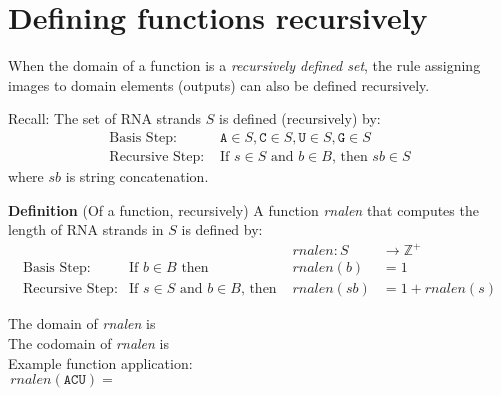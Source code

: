 \documentclass[12pt, oneside]{article}
\newcommand{\A}[0]{\texttt{A}}
\newcommand{\C}[0]{\texttt{C}}
\newcommand{\G}[0]{\texttt{G}}
\newcommand{\U}[0]{\texttt{U}}
\newcommand{\cmark}{\ding{51}}
\newcommand{\xmark}{\ding{55}}
\begin{document}
\vfill
\vfill

\begin{comment}
    

{\it Extra example:} A new movie is released, and $P_1$ and $P_2$ watch it before $P_3$, and give it
ratings; $P_1$ gives \cmark~and $P_2$ gives \xmark.
Should this movie be recommended to $P_3$? Why or why not?

{\it Extra example:} Define a new function that could be used to compare the $4$-tuples of ratings encoding
movie preferences now that there are four movies in the database.

\vfill
\end{comment}
\newpage \vfill
\section*{Defining functions recursively}


When the domain of a function is a {\it recursively defined set}, the rule assigning 
images to domain elements (outputs) can also be defined recursively.

Recall: The set of RNA strands $S$ is defined (recursively) by:
\[
\begin{array}{ll}
\textrm{Basis Step: } & \A \in S, \C \in S, \U \in S, \G \in S \\
\textrm{Recursive Step: } & \textrm{If } s \in S\textrm{ and }b \in B \textrm{, then }sb \in S
\end{array}
\]
where $sb$ is string concatenation.

{\bf Definition} (Of a function, recursively) A function \textit{rnalen} that computes the length of RNA strands in $S$ is defined by:
\[
\begin{array}{llll}
& & \textit{rnalen} : S & \to \mathbb{Z}^+ \\
\textrm{Basis Step:} & \textrm{If } b \in B\textrm{ then } & \textit{rnalen}(b) & = 1 \\
\textrm{Recursive Step:} & \textrm{If } s \in S\textrm{ and }b \in B\textrm{, then  } & \textit{rnalen}(sb) & = 1 + \textit{rnalen}(s)
\end{array}
\]

The domain of \textit{rnalen} is \phantom{$S$}\\

The codomain of \textit{rnalen} is \\

Example function application:
\[
rnalen(\A\C\U) = \phantom{1+ rnalen(\A\C) = 1 + (1 + rnalen(\A) ) = 1 + ( 1 + 1) = 3}
\]
\end{document}
